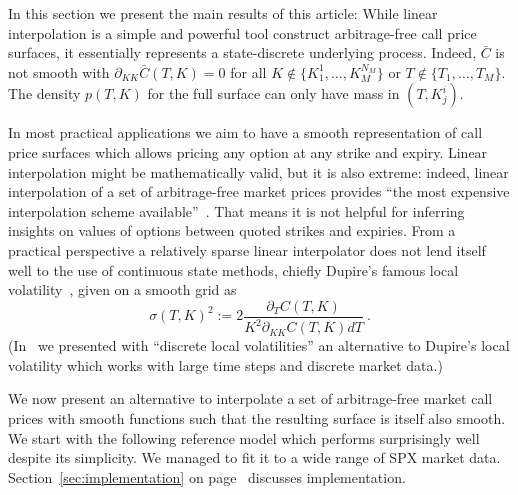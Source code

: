 \documentclass[twoside]{article}
\theoremstyle{plain}
\theoremstyle{definition}
\theoremstyle{remark}
\begin{document}
In this section we present the main results of this article: 
While linear interpolation is a simple and powerful tool construct arbitrage-free call price surfaces, it essentially represents
a state-discrete underlying process. Indeed, $\bar C$ is not smooth with $\partial_{KK} \bar C(T,K)=0$ for all $K\not\in \{K^1_1,\ldots,K^{N_M}_M\}$ or $T\not\in\{ T_1,\ldots,T_M \}$.
The density $p(T,K)$ for the full surface can only have mass in $(T,K^i_j)$.

In most practical applications we aim to have a smooth representation of call price surfaces which allows pricing any option at any strike and expiry. Linear interpolation
might be mathematically valid, but it is also extreme: indeed, linear interpolation of a set of arbitrage-free market prices provides ``the most expensive interpolation scheme
available''~\cite{buehler2006expensive}. That means it is not helpful for inferring insights on values of options between quoted strikes and expiries. From a practical perspective a relatively sparse linear interpolator does not lend itself well to the use of continuous state methods, chiefly Dupire's famous local volatility~\cite{dupire1994pricing},
given on a smooth grid as
$$
    \sigma(T,K)^2 := 2 \frac{ \partial_T C(T,K) }{ K^2 \partial_{KK} C(T,K) dT } \ .
$$
(In~\cite{DLV} we presented with ``discrete local volatilities'' an alternative
to Dupire's local volatility which works with large time steps and discrete market data.)
 
We now present an alternative to interpolate a set of arbitrage-free market call prices with smooth functions such that the resulting surface is itself also smooth.
We start with the following reference model which performs surprisingly well
despite its simplicity. We managed to fit it to a wide range of SPX market data.
Section~\ref{sec:implementation} on page~\pageref{sec:implementation} 
discusses implementation.
\end{document}
